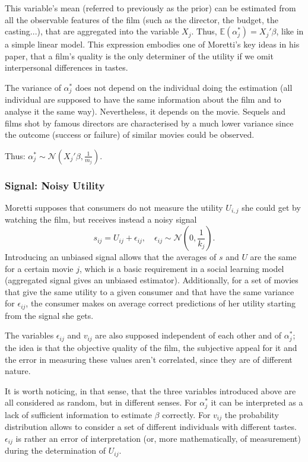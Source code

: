 	This variable's mean (referred to previously as the prior) can be estimated from all the observable features of the film (such as the director, the budget, the casting...), that are aggregated into the variable $X_{j}$. Thus, $\mathbb{E}(\alpha_{j}^{*})=X_{j}'\beta$, like in a simple linear model. This expression embodies one of Moretti's key ideas in his paper, that a film's quality is the only determiner of the utility if we omit interpersonal differences in tastes.

	The variance of $\alpha_{j}^{*}$ does not depend on the individual doing the estimation (all individual are supposed to have the same information about the film and to analyse it the same way). Nevertheless, it depends on the movie. Sequels and films shot by famous directors are characterised by a much lower variance since the outcome (success or failure) of similar movies could be observed.

	Thus: $\alpha_{j}^{*}\sim \mathcal{N}(X_{j}'\beta,\frac{1}{m_{j}})$.
	
	\subsubsection{Signal: Noisy Utility}
	Moretti supposes that consumers do not measure the utility $U_{i,j}$ she could get by watching the film, but receives instead a noisy signal
	\begin{equation*}
	s_{i j}=U_{i j}+\epsilon_{i j}, \quad\epsilon_{i j}\sim \mathcal{N}(0,\frac{1}{k_{j}}).
	\end{equation*}
	Introducing an unbiased signal allows that the averages of $s$ and $U$ are the same for a certain movie $j$, which is a basic requirement in a social learning model (aggregated signal gives an unbiased estimator). Additionally, for a set of movies that give the same utility to a given consumer and that have the same variance for $\epsilon_{i j}$, the consumer makes on average correct predictions of her utility starting from the signal she gets.

	The variables $\epsilon_{i j}$ and $v_{i j}$ are also supposed independent of each other and of $\alpha_{j}^{*}$; the idea is that the objective quality of the film, the subjective appeal for it and the error in measuring these values aren't correlated, since they are of different nature.

	It is worth noticing, in that sense, that the three variables introduced above are all considered as random, but in different senses. For  $\alpha_{j}^{*}$ it can be interpreted as a lack of sufficient information to estimate $\beta$ correctly. For $v_{i j}$ the probability distribution allows to consider a set of different individuals with different tastes. $\epsilon_{i j}$ is rather an error of interpretation (or, more mathematically, of measurement) during the determination of $U_{i j}$.


